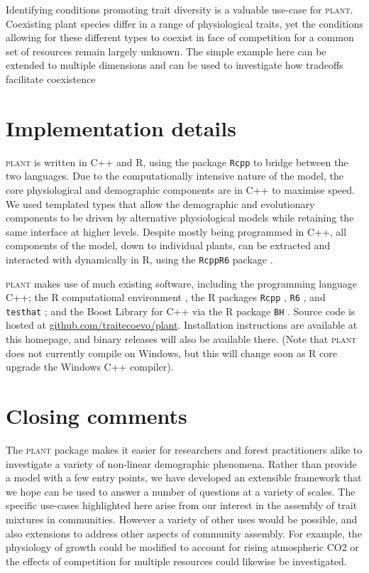 \documentclass[a4paper,11pt]{article}
\newcommand{\plant}{\textsc{plant}}
\begin{document}
Identifying conditions promoting trait diversity is a valuable use-case
for {\plant}. Coexisting plant species differ in a range of physiological
traits, yet the conditions allowing for these different types to coexist
in face of competition for a common set of resources remain largely
unknown. The simple example here can be extended to multiple dimensions
and can be used to investigate how tradeoffs facilitate coexistence
\citep{Falster-2015}

\section{Implementation details}

{\plant} is written in C++ and R, using the package \texttt{Rcpp}
\citep{Eddelbuettel-2011, Eddelbuettel-2013} to bridge between the two
languages. Due to the computationally intensive nature of the model, the
core physiological and demographic components are in C++ to maximise
speed. We used templated types that allow the demographic and evolutionary
components to be driven by alternative physiological models while
retaining the same interface at higher levels. Despite mostly being
programmed in C++, all components of the model, down to individual
plants, can be extracted and interacted with dynamically in R, using the
\texttt{RcppR6} package \citep{RcppR6}.

{\plant} makes use of much existing software, including the programming
language C++; the R computational environment \citep{R-2015}, the R
packages \texttt{Rcpp} \citep{Eddelbuettel-2011, Eddelbuettel-2013},
\texttt{R6} \citep{Chang-2014}, and \texttt{testhat}
\citep{Wickham-2011}; and the Boost Library for C++
\citep{Schaling-2014} via the R package \texttt{BH}
\citep{Eddelbuettel-2015}. Source code is hosted at
\href{https://github.com/traitecoevo/plant}{github.com/traitecoevo/plant}.
Installation instructions are available at this homepage, and binary
releases will also be available there.  (Note that {\plant} does not
currently compile on Windows, but this will change soon as R core
upgrade the Windows C++ compiler).

\section{Closing comments}

The {\plant} package makes it easier for researchers and forest practitioners
alike to investigate a variety of non-linear demographic phenomena.  Rather
than provide a model with a few entry points, we have developed an extensible
framework that we hope can be used to answer a number of questions at a
variety of scales. The specific use-cases highlighted here arise from our
interest in the assembly of trait mixtures in communities. However a variety
of other uses would be possible, and also extensions to address other aspects
of community assembly. For example,  the physiology of growth could be
modified to account for rising atmospheric CO2 or the effects of competition
for multiple resources could likewise be investigated.
\end{document}
